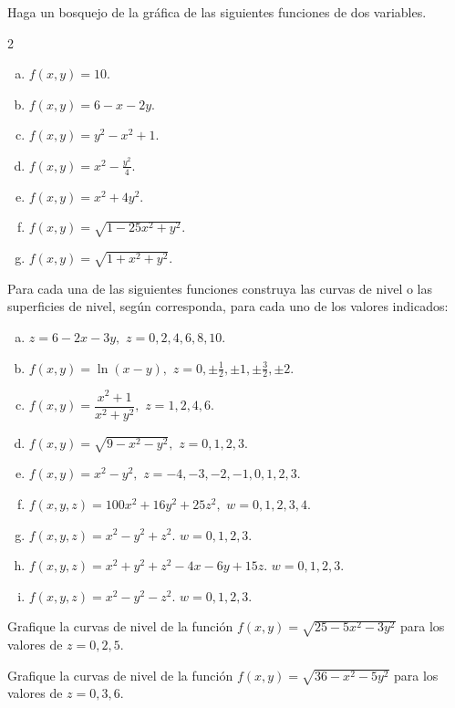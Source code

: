 \begin{prob}
Haga un bosquejo de la gráfica de las siguientes funciones de dos variables.
\begin{multicols}{2}
\begin{enumerate}[(a)]
    \item  $f(x,y)=10.$
    \item  $f(x,y)=6-x-2y.$
    \item  $f(x,y)=y^2-x^2+1.$
    \item $f(x,y)=x^2-\frac{y^2}{4}.$
    \item $f(x,y)=x^2+4y^2.$
    \item $f(x,y)=\sqrt{1-25x^2+y^2}.$
    \item $f(x,y)=\sqrt{1+x^2+y^2}.$
\end{enumerate}
\end{multicols}
\end{prob}


\begin{prob}
Para cada una de las siguientes funciones construya las curvas de nivel o las superficies de nivel, según corresponda, para cada uno de los valores indicados:
\begin{enumerate}[(a)]
    \item $z=6-2x-3y,$ $z=0,2,4,6,8,10.$
    \item $f(x,y)=\ln(x-y),$ $z=0,\pm \frac{1}{2},\pm 1, \pm \frac{3}{2},\pm 2.$ 
    \item $f(x,y)=\dfrac{x^2+1}{x^2+y^2},$ $z=1,2,4,6.$
    \item $f(x,y)=\sqrt{9-x^2-y^2},$ $z=0,1,2,3.$
    \item $f(x,y)=x^2-y^2,$ $z=-4,-3,-2,-1,0,1,2,3.$
    \item $f(x,y,z)=100x^2+16y^2+25z^2,$ $w=0,1,2,3,4.$
    \item $f(x,y,z)=x^2-y^2+z^2.$ $w=0,1,2,3.$
    \item $f(x,y,z)=x^2+y^2+z^2-4x-6y+15z.$ $w=0,1,2,3.$
    \item $f(x,y,z)=x^2-y^2-z^2.$ $w=0,1,2,3.$
\end{enumerate}
\end{prob}


\begin{prob}
Grafique la curvas de nivel de la función $f(x,y)=\sqrt{25-5x^2-3y^2}$ para los valores de $z=0,2,5.$
\end{prob}


\begin{prob}
Grafique la curvas de nivel de la función $f(x,y)=\sqrt{36-x^2-5y^2}$ para los valores de $z=0,3,6.$
\end{prob}



